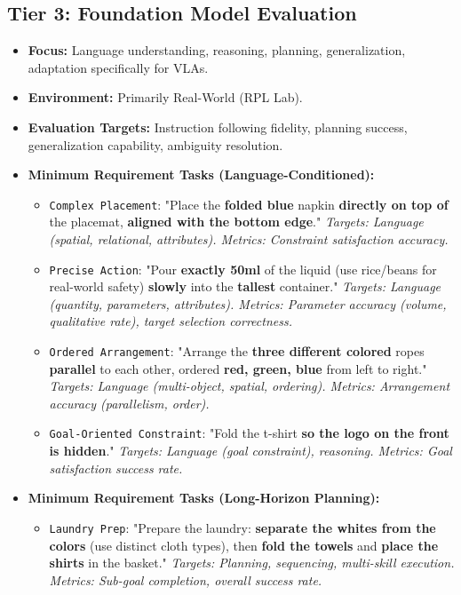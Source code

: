 \subsection{Tier 3: Foundation Model Evaluation}
\begin{itemize}
    \item \textbf{Focus:} Language understanding, reasoning, planning, generalization, adaptation specifically for VLAs.
    \item \textbf{Environment:} Primarily Real-World (RPL Lab).
    \item \textbf{Evaluation Targets:} Instruction following fidelity, planning success, generalization capability, ambiguity resolution.
    \item \textbf{Minimum Requirement Tasks (Language-Conditioned):}
        \begin{itemize}
            \item \texttt{Complex Placement}: "Place the \textbf{folded blue} napkin \textbf{directly on top of} the placemat, \textbf{aligned with the bottom edge}." \textit{Targets: Language (spatial, relational, attributes). Metrics: Constraint satisfaction accuracy.}
            \item \texttt{Precise Action}: "Pour \textbf{exactly 50ml} of the liquid (use rice/beans for real-world safety) \textbf{slowly} into the \textbf{tallest} container." \textit{Targets: Language (quantity, parameters, attributes). Metrics: Parameter accuracy (volume, qualitative rate), target selection correctness.}
            \item \texttt{Ordered Arrangement}: "Arrange the \textbf{three different colored} ropes \textbf{parallel} to each other, ordered \textbf{red, green, blue} from left to right." \textit{Targets: Language (multi-object, spatial, ordering). Metrics: Arrangement accuracy (parallelism, order).}
            \item \texttt{Goal-Oriented Constraint}: "Fold the t-shirt \textbf{so the logo on the front is hidden}." \textit{Targets: Language (goal constraint), reasoning. Metrics: Goal satisfaction success rate.}
        \end{itemize}
    \item \textbf{Minimum Requirement Tasks (Long-Horizon Planning):}
        \begin{itemize}
            \item \texttt{Laundry Prep}: "Prepare the laundry: \textbf{separate the whites from the colors} (use distinct cloth types), then \textbf{fold the towels} and \textbf{place the shirts} in the basket." \textit{Targets: Planning, sequencing, multi-skill execution. Metrics: Sub-goal completion, overall success rate.}

\end{itemize}
\end{itemize}
